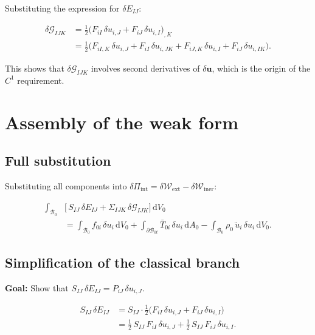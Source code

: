 \documentclass[11pt]{article}
\newcommand{\bu}{\mathbf{u}}
\newcommand{\bu}{\mathbf{u}}
\begin{document}
Substituting the expression for $\delta E_{IJ}$:

\begin{align}
\delta\mathcal{G}_{IJK}
&= \tfrac12\bigl(F_{iI}\,\delta u_{i,J}
              + F_{iJ}\,\delta u_{i,I}\bigr)_{,K}
\nonumber\\
&= \tfrac12\bigl(F_{iI,K}\,\delta u_{i,J}
              + F_{iI}\,\delta u_{i,JK}
              + F_{iJ,K}\,\delta u_{i,I}
              + F_{iJ}\,\delta u_{i,IK}\bigr).
\end{align}

This shows that $\delta\mathcal{G}_{IJK}$ involves second derivatives
of $\delta\bu$, which is the origin of the $C^{1}$ requirement.

\section{Assembly of the weak form}

\subsection{Full substitution}

Substituting all components into $\delta\Pi_{\mathrm{int}}
= \delta\mathcal{W}_{\mathrm{ext}} - \delta\mathcal{W}_{\mathrm{iner}}$:

\begin{align}
\int_{\mathcal{B}_{0}}
&\bigl[\,S_{IJ}\,\delta E_{IJ}
      + \Sigma_{IJK}\,\delta\mathcal{G}_{IJK}\bigr]\,
  \mathrm{d}V_{0}
\nonumber\\
&= \int_{\mathcal{B}_{0}} f_{0i}\,\delta u_{i}\,\mathrm{d}V_{0}
 + \int_{\partial\mathcal{B}_{0t}} \bar{T}_{0i}\,\delta u_{i}\,
   \mathrm{d}A_{0}
 - \int_{\mathcal{B}_{0}} \rho_{0}\,\ddot{u}_{i}\,\delta u_{i}\,
   \mathrm{d}V_{0}.
\label{fd:weak_full}
\end{align}

\subsection{Simplification of the classical branch}
\label{fd:classical_simplify}

\textbf{Goal:} Show that $S_{IJ}\,\delta E_{IJ} = P_{iJ}\,\delta u_{i,J}$.

\begin{align}
S_{IJ}\,\delta E_{IJ}
&= S_{IJ}\cdot\tfrac12\bigl(F_{iI}\,\delta u_{i,J}
                        + F_{iJ}\,\delta u_{i,I}\bigr)
\nonumber\\
&= \tfrac12\,S_{IJ}\,F_{iI}\,\delta u_{i,J}
 + \tfrac12\,S_{IJ}\,F_{iJ}\,\delta u_{i,I}.
\end{align}
\end{document}
